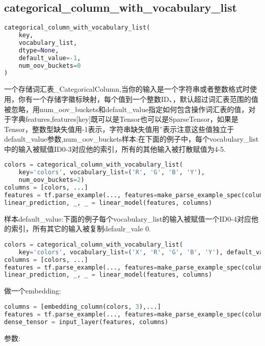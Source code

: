 \subsection{categorical\_column\_with\_vocabulary\_list}
\begin{lstlisting}[language=Python]
categorical_column_with_vocabulary_list(
    key,
    vocabulary_list,
    dtype=None,
    default_value=-1,
    num_oov_buckets=0
)
\end{lstlisting}
一个存储词汇表\_CategoricalColumn,当你的输入是一个字符串或者整数格式时使用，你有一个存储字徽标映射，每个值到一个整数ID、，默认超过词汇表范围的值被忽略，用num\_oov\_buckets和default\_value指定如何包含操作词汇表的值，对于字典features,features[key]既可以是Tensor也可以是SparseTensor，如果是Tensor，整数型缺失值用-1表示，字符串缺失值用''表示注意这些值独立于default\_value参数,num\_oov\_buckets样本:在下面的例子中，每个vocabulary\_list中的输入被赋值ID0-3对应他的索引，所有的其他输入被打散赋值为4-5.
\begin{lstlisting}[language=Python]
colors = categorical_column_with_vocabulary_list(
    key='colors', vocabulary_list=('R', 'G', 'B', 'Y'),
    num_oov_buckets=2)
columns = [colors, ...]
features = tf.parse_example(..., features=make_parse_example_spec(columns))
linear_prediction, _, _ = linear_model(features, columns)
\end{lstlisting}
样本default\_value:下面的例子每个vocabulary\_list的输入被赋值一个ID0-4对应他的索引，所有其它的输入被复制defaulr\_vale 0.
\begin{lstlisting}[language=Python]
colors = categorical_column_with_vocabulary_list(
    key='colors', vocabulary_list=('X', 'R', 'G', 'B', 'Y'), default_value=0)
columns = [colors, ...]
features = tf.parse_example(..., features=make_parse_example_spec(columns))
linear_prediction, _, _ = linear_model(features, columns)
\end{lstlisting}
做一个embedding:
\begin{lstlisting}[language=Python]
columns = [embedding_column(colors, 3),...]
features = tf.parse_example(..., features=make_parse_example_spec(columns))
dense_tensor = input_layer(features, columns)
\end{lstlisting}
参数:

